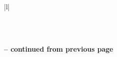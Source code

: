\documentclass[12pt]{article}
\begin{document}
\begin{center}
\begin{longtable}{|l|}
\caption{Domains that are present in both D1 and D2 (gotten from finalA)} \label{tab:long} \\

\hline {}  \\ \hline 
\endfirsthead

%
{{\bfseries \tablename \thetable{} -- continued from previous page}} \\
\hline  {}  \\ \hline 
\endhead

\hline {} \\ \hline
\endfoot


\end{longtable}
\end{center}
\end{document}
